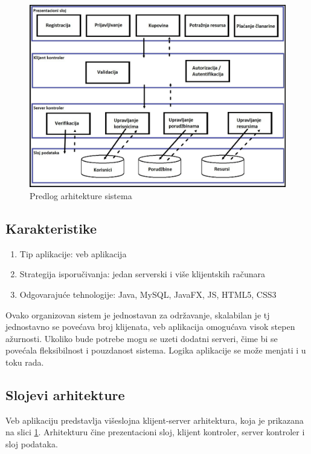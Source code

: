 \documentclass[a4paper]{article}
\begin{document}
\begin{figure}[h!]
    \centering
    \includegraphics[scale=0.335]{images/Predlog_arhitekture.jpg}
    \caption{Predlog arhitekture sistema}
    \label{predlog_arhitekture_sistema}
\end{figure}

\subsection{Karakteristike}

\begin{enumerate}
    \item Tip aplikacije: veb aplikacija
    \item Strategija isporučivanja: jedan serverski i više klijentskih računara
    \item Odgovarajuće tehnologije: Java, MySQL, JavaFX, JS, HTML5, CSS3
\end{enumerate}

\indent Ovako organizovan sistem je jednostavan za održavanje, skalabilan je tj jednostavno se povećava broj klijenata, veb aplikacija omogućava visok stepen ažurnosti. Ukoliko bude potrebe mogu se uzeti dodatni serveri, čime bi se povećala fleksibilnost i pouzdanost sistema. Logika aplikacije se može menjati i u toku rada.

\subsection{Slojevi arhitekture}

\indent Veb aplikaciju predstavlja višeslojna klijent-server arhitektura, koja je prikazana na slici \ref{predlog_arhitekture_sistema}. Arhitekturu čine prezentacioni sloj, klijent kontroler, server kontroler i sloj podataka.
\end{document}
